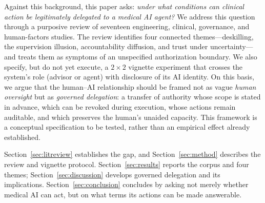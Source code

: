 Against this background, this paper asks: \emph{under what conditions can clinical action be legitimately delegated to a medical AI agent?} We address this question through a purposive review of seventeen engineering, clinical, governance, and human-factors studies. The review identifies four connected themes---deskilling, the supervision illusion, accountability diffusion, and trust under uncertainty---and treats them as symptoms of an unspecified authorization boundary. We also specify, but do not yet execute, a $2\times2$ vignette experiment that crosses the system's role (advisor or agent) with disclosure of its AI identity. On this basis, we argue that the human--AI relationship should be framed not as vague \emph{human oversight} but as \emph{governed delegation}: a transfer of authority whose scope is stated in advance, which can be revoked during execution, whose actions remain auditable, and which preserves the human's unaided capacity. This framework is a conceptual specification to be tested, rather than an empirical effect already established.

Section~\ref{sec:litreview} establishes the gap, and Section~\ref{sec:method} describes the review and vignette protocol. Section~\ref{sec:results} reports the corpus and four themes; Section~\ref{sec:discussion} develops governed delegation and its implications. Section~\ref{sec:conclusion} concludes by asking not merely whether medical AI can act, but on what terms its actions can be made answerable.
